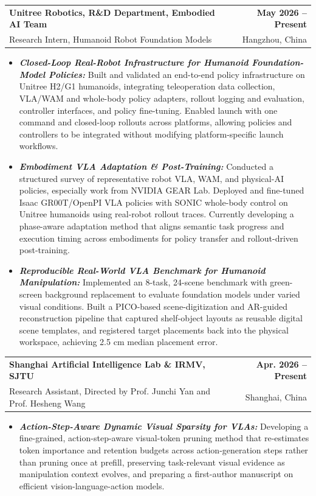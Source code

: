 \documentclass[11pt,letterpaper]{article}
\makeatletter
\newcommand{\resumeSubheading}[4]{
    \begin{tabularx}{\textwidth}{@{}Xr@{}}
        \textbf{#1} & \textbf{#2} \\
        #3 & #4 \\
    \end{tabularx}
}
\newcommand{\resumeItem}[1]{
    \item #1
}
\makeatother
\begin{document}
\resumeSubheading
{ Unitree Robotics, R\&D Department, Embodied AI Team}
{May 2026 -- Present}
{\hspace*{1.4em}Research Intern, Humanoid Robot Foundation Models}
{Hangzhou, China}
\begin{itemize}[leftmargin=2.4em, itemsep=0.5pt, topsep=0pt]
    \small
    \resumeItem{\textbf{\textit{Closed-Loop Real-Robot Infrastructure for Humanoid Foundation-Model Policies:}} Built and validated an end-to-end policy infrastructure on Unitree H2/G1 humanoids, integrating teleoperation data collection, VLA/WAM and whole-body policy adapters, rollout logging and evaluation, controller interfaces, and policy fine-tuning. Enabled launch with one command and closed-loop rollouts across platforms, allowing policies and controllers to be integrated without modifying platform-specific launch workflows.}
    \resumeItem{\textbf{\textit{Embodiment VLA Adaptation \& Post-Training:}} Conducted a structured survey of representative robot VLA, WAM, and physical-AI policies, especially work from NVIDIA GEAR Lab. Deployed and fine-tuned Isaac GR00T/OpenPI VLA policies with SONIC whole-body control on Unitree humanoids using real-robot rollout traces. Currently developing a phase-aware adaptation method that aligns semantic task progress and execution timing across embodiments for policy transfer and rollout-driven post-training.}
    \resumeItem{\textbf{\textit{Reproducible Real-World VLA Benchmark for Humanoid Manipulation:}} Implemented an 8-task, 24-scene benchmark with green-screen background replacement to evaluate foundation models under varied visual conditions. Built a PICO-based scene-digitization and AR-guided reconstruction pipeline that captured shelf-object layouts as reusable digital scene templates, and registered target placements back into the physical workspace, achieving 2.5 cm median placement error.}
\end{itemize}

\resumeSubheading
{Shanghai Artificial Intelligence Lab \& IRMV, SJTU }
{Apr. 2026 -- Present}
{\hspace*{1.4em}Research Assistant, Directed by Prof. Junchi Yan and Prof. Hesheng Wang}
{Shanghai, China}
\begin{itemize}[leftmargin=2.4em, itemsep=0.5pt, topsep=0pt]
    \small
    \resumeItem{\textbf{\textit{Action-Step-Aware Dynamic Visual Sparsity for VLAs:}} Developing a fine-grained, action-step-aware visual-token pruning method that re-estimates token importance and retention budgets across action-generation steps rather than pruning once at prefill, preserving task-relevant visual evidence as manipulation context evolves, and preparing a first-author manuscript on efficient vision-language-action models.}
\end{itemize}
\end{document}
